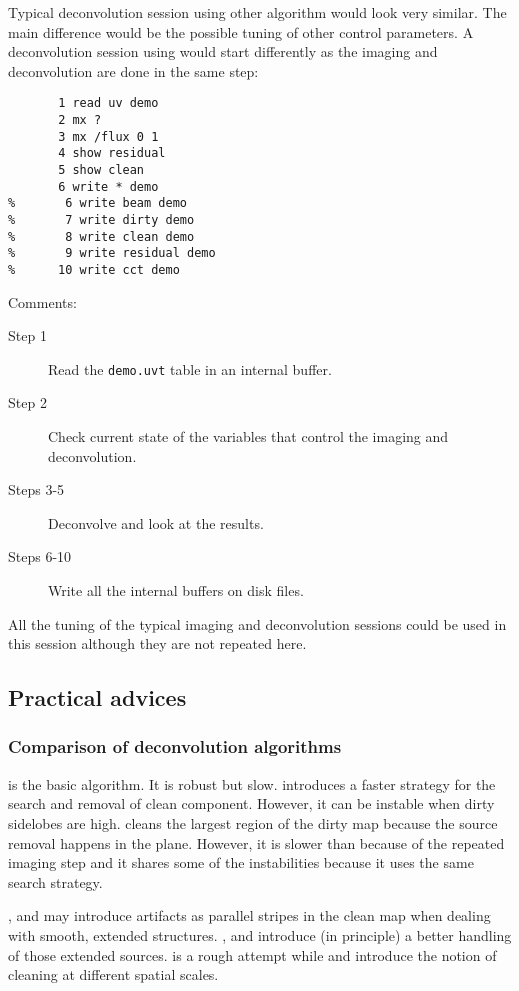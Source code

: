 Typical deconvolution session using other \clean{} algorithm would look
very similar. The main difference would be the possible tuning of other
control parameters. A deconvolution session using  would start
differently as the imaging and deconvolution are done in the same step:
\begin{verbatim}
       1 read uv demo
       2 mx ?
       3 mx /flux 0 1
       4 show residual
       5 show clean
       6 write * demo
%       6 write beam demo
%       7 write dirty demo
%       8 write clean demo
%       9 write residual demo
%      10 write cct demo
\end{verbatim}
Comments:
\begin{description}
\item[Step 1] Read the \texttt{demo.uvt} \uv{} table in an internal buffer.
\item[Step 2] Check current state of the variables that control the
  imaging and deconvolution.
\item[Steps 3-5] Deconvolve and look at the results.
\item[Steps 6-10] Write all the internal buffers on disk files. 
\end{description}
All the tuning of the typical imaging and deconvolution sessions could be
used in this  session although they are not repeated here.

\subsection{Practical advices}

\subsubsection{Comparison of deconvolution algorithms}

 is the basic \clean{} algorithm. It is robust but slow.
 introduces a faster strategy for the search and removal of
clean component. However, it can be instable when dirty sidelobes are high.
 cleans the largest region of the dirty map because the source
removal happens in the \uv{} plane. However, it is slower than 
because of the repeated imaging step and it shares some of the 
instabilities because it uses the same search strategy.

,  and  may introduce artifacts as parallel
stripes in the clean map when dealing with smooth, extended structures.
,  and  introduce (in principle) a better
handling of those extended sources.  is a rough attempt while
 and  introduce the notion of cleaning at different
spatial scales.

